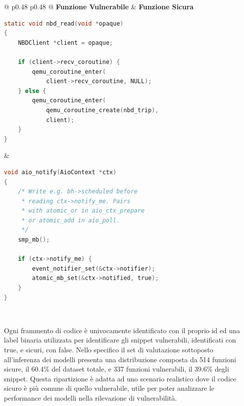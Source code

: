 \begin{table}[htbp]
    \centering
    \caption{Esempio di funzione vulnerabile e funzione sicura}
    \label{tab:confronto_codice}
    \begin{tabular}{@{} p{0.48\textwidth} p{0.48\textwidth} @{}}
        \toprule
        \textbf{Funzione Vulnerabile} & \textbf{Funzione Sicura} \\
        \midrule
        
        \begin{minipage}[t]{\linewidth}
            \vspace{0pt} 
\begin{lstlisting}[language=C, basicstyle=\ttfamily\footnotesize, breaklines=true, tabsize=4]
static void nbd_read(void *opaque)
{
    NBDClient *client = opaque;

    if (client->recv_coroutine) {
        qemu_coroutine_enter(
            client->recv_coroutine, NULL);
    } else {
        qemu_coroutine_enter(
            qemu_coroutine_create(nbd_trip), 
            client);
    }
}
\end{lstlisting}
        \end{minipage}
        
        & 
        
        \begin{minipage}[t]{\linewidth}
            \vspace{0pt} 
\begin{lstlisting}[language=C, basicstyle=\ttfamily\footnotesize, breaklines=true, tabsize=4]
void aio_notify(AioContext *ctx)
{
    /* Write e.g. bh->scheduled before 
     * reading ctx->notify_me. Pairs
     * with atomic_or in aio_ctx_prepare 
     * or atomic_add in aio_poll.
     */
    smp_mb();
    
    if (ctx->notify_me) {
        event_notifier_set(&ctx->notifier);
        atomic_mb_set(&ctx->notified, true);
    }
}
\end{lstlisting}
        \end{minipage} \\
        
        \bottomrule
    \end{tabular}
\end{table}

Ogni frammento di codice è univocamente identificato con il proprio id ed una label binaria utilizzata per identificare gli snippet vulnerabili, identificati con true, e sicuri, con false.
Nello specifico il set di valutazione sottoposto all'inferenza dei modelli presenta una distribuzione composta da 514 funzioni sicure, il 60.4\% del dataset totale, e 337 funzioni vulnerabili, il 39.6\% degli snippet. Questa ripartizione è adatta ad uno scenario realistico dove il codice sicuro è più comune di quello vulnerabile, utile per poter analizzare le performance dei modelli nella rilevazione di vulnerabilità.

